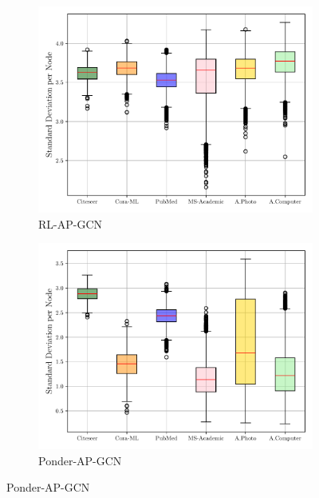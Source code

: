 \documentclass{gdl}
\begin{document}
\begin{figure}[p]
\begin{minipage}[t]{0.48\textwidth}
        \begin{subfigure}[b]{0.7\textwidth}
            \centering
            \includegraphics[width=\textwidth]{RL-AP-GCN_std_steps_per_node_boxplot.pdf}
            \captionsetup{justification=centerlast}
            \caption{RL-AP-GCN}
            \label{fig:step_std_RL_AP_GCN}
        \end{subfigure}
        
        \begin{subfigure}[b]{0.7\textwidth}
            \centering
            \includegraphics[width=\textwidth]{Ponder-AP-GCN_std_steps_per_node_boxplot.pdf}
            \captionsetup{justification=centerlast}
            \caption{Ponder-AP-GCN}
            \label{fig:step_std_Ponder_AP_GCN}
        \end{subfigure}
        

\end{minipage}
\end{figure}
\end{document}
